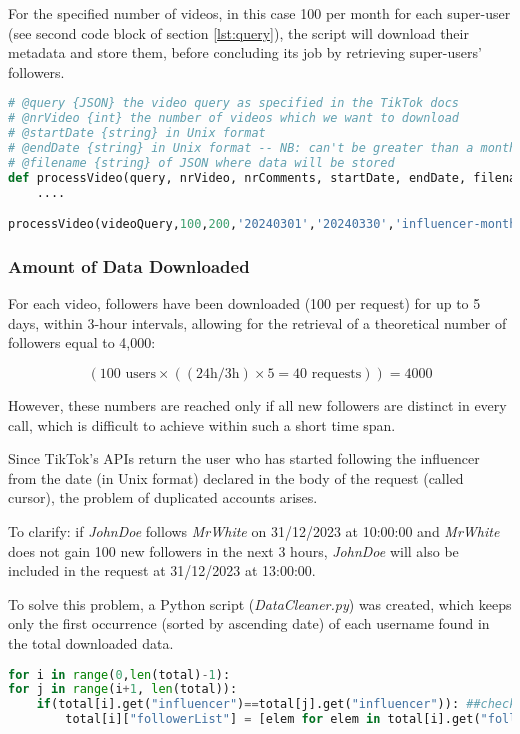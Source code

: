 For the specified number of videos, in this case 100 per month for each super-user (see second code block of section \ref{lst:query}), the script will download their metadata and store them, before concluding its job by retrieving super-users' followers.

\begin{lstlisting}[language=Python]
# @query {JSON} the video query as specified in the TikTok docs
# @nrVideo {int} the number of videos which we want to download
# @startDate {string} in Unix format
# @endDate {string} in Unix format -- NB: can't be greater than a month
# @filename {string} of JSON where data will be stored
def processVideo(query, nrVideo, nrComments, startDate, endDate, filename):
    ....

processVideo(videoQuery,100,200,'20240301','20240330','influencer-month')
\end{lstlisting}

\subsubsection*{Amount of Data Downloaded}

For each video, followers have been downloaded (100 per request) for up to 5 days, within 3-hour intervals, allowing for the retrieval of a theoretical number of followers equal to 4,000:

\[ (100 \text{ users} \times ((24 \text{h}/3 \text{h}) \times 5 = 40 \text{ requests})) = 4000 \]

However, these numbers are reached only if all new followers are distinct in every call, which is difficult to achieve within such a short time span.

Since TikTok's APIs return the user who has started following the influencer from the date (in Unix format) declared in the body of the request (called cursor), the problem of duplicated accounts arises.

To clarify: if \textit{JohnDoe} follows \textit{MrWhite} on 31/12/2023 at 10:00:00 and \textit{MrWhite} does not gain 100 new followers in the next 3 hours, \textit{JohnDoe} will also be included in the request at 31/12/2023 at 13:00:00.

To solve this problem, a Python script (\textit{DataCleaner.py}) was created, which keeps only the first occurrence (sorted by ascending date) of each username found in the total downloaded data.

\begin{lstlisting}[language=Python]
for i in range(0,len(total)-1):
for j in range(i+1, len(total)):
    if(total[i].get("influencer")==total[j].get("influencer")): ##check if the same influencer (we don't want to remove common followers)
        total[i]["followerList"] = [elem for elem in total[i].get("followerList") if elem not in total[j].get("followerList")]
\end{lstlisting}

